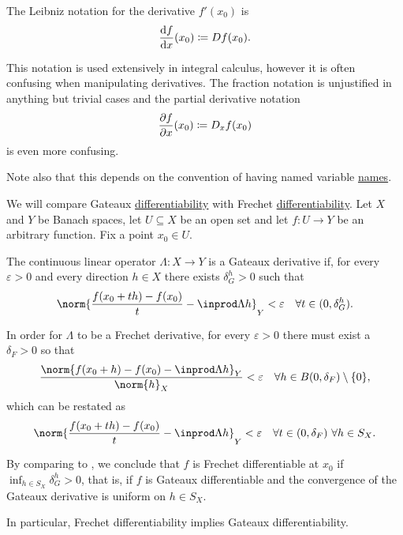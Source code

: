 \begin{remark}
\begin{thmenum}
     The Leibniz notation for the derivative \( f'(x_0) \) is
    \begin{equation*}
      \diff f x (x_0) \coloneqq D f(x_0).
    \end{equation*}

    This notation is used extensively in integral calculus, however it is often confusing when manipulating derivatives. The fraction notation is unjustified in anything but trivial cases and the partial derivative notation
    \begin{equation*}
      \diffp f x (x_0) \coloneqq D_x f(x_0)
    \end{equation*}
    is even more confusing.

    Note also that this depends on the convention of having named variable \hyperref[def:function_arguments]{names}.
  \end{thmenum}
\end{remark}

\begin{remark}\label{rem:gateaux_vs_frechet}
  We will compare Gateaux \hyperref[def:differentiability/gateaux]{differentiability} with Frechet \hyperref[def:differentiability/frechet]{differentiability}. Let \( X \) and \( Y \) be Banach spaces, let \( U \subseteq X \) be an open set and let \( f: U \to Y \) be an arbitrary function. Fix a point \( x_0 \in U \).

  The continuous linear operator \( \Lambda: X \to Y \) is a Gateaux derivative if, for every \( \varepsilon > 0 \) and every direction \( h \in X \) there exists \( \delta_G^h > 0 \) such that
  \begin{equation}\label{rem:gateaux_vs_frechet/gateaux}
    \norm{\frac {f(x_0 + th) - f(x_0)} t - \inprod \Lambda h}_Y < \varepsilon \quad\forall t \in (0, \delta_G^h).
  \end{equation}

  In order for \( \Lambda \) to be a Frechet derivative, for every \( \varepsilon > 0 \) there must exist a \( \delta_F > 0 \) so that
  \begin{equation*}
    \frac{\norm{f(x_0 + h) - f(x_0) - \inprod \Lambda h}_Y} {\norm{h}_X} < \varepsilon \quad\forall h \in B(0, \delta_F) \setminus \{ 0 \},
  \end{equation*}
  which can be restated as
  \begin{equation}\label{rem:gateaux_vs_frechet/frechet}
    \norm{\frac {f(x_0 + th) - f(x_0)} t - \inprod \Lambda h}_Y < \varepsilon \quad\forall t \in (0, \delta_F) \ \forall h \in S_X.
  \end{equation}

  By comparing  to , we conclude that \( f \) is Frechet differentiable at \( x_0 \) if \( \inf_{h \in S_X} \delta^h_G > 0 \), that is, if \( f \) is Gateaux differentiable and the convergence of the Gateaux derivative is uniform on \( h \in S_X \).

  In particular, Frechet differentiability implies Gateaux differentiability.
\end{remark}
